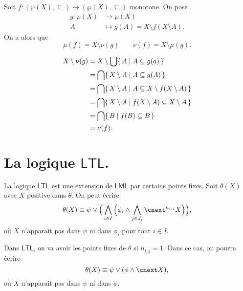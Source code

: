\documentclass[./main]{subfiles}
\begin{document}
  \begin{lem}
    Soit $f : (\wp(X), \subseteq) \to (\wp(X), \subseteq)$ monotone. On pose 
    \begin{align*}
      g: \wp(X) &\longrightarrow \wp(X) \\
      A &\longmapsto g(A) = X \setminus f(X \setminus A)
    .\end{align*}
    On a alors que 
    \[
    \mu(f) = X \setminus \nu(g) \quad\quad \nu(f) = X \setminus \mu(g)
    .\] 
  \end{lem}
  \begin{prv}
    \begin{align*}
      X \setminus \nu(g)
      &= X \setminus \bigcup \mleft\{\,A  \;\middle|\; A \subseteq g(a)\,\mright\}  \\
      &= \bigcap \mleft\{\,X \setminus A \;\middle|\; A \subseteq g(A)\,\mright\} \\
      &= \bigcap \mleft\{\,X \setminus A \;\middle|\; A \subseteq X \setminus f(X \setminus A)\,\mright\} \\
      &= \bigcap \mleft\{\,X \setminus A \;\middle|\; f(X \setminus A) \subseteq X \setminus A\,\mright\} \\
      &= \bigcap \mleft\{\,B \;\middle|\; f(B) \subseteq B\,\mright\}  \\
      &= \nu(f)
    .\end{align*}
  \end{prv}

  \section{La logique $\mathsf{LTL}$.}

  La logique $\mathsf{LTL}$ est une extension de $\mathsf{LML}$ par certains points fixes.
  Soit $\theta(X)$ avec  $X$ positive dans $\theta$.
  On peut écrire 
  \[
  \theta(X) \equiv \psi \lor \Big( \bigwedge_{i \in I} \Big( \phi_i \land \bigwedge_{j \in J_i} \nxt^{n_{i,j}} X \Big) \Big)
  ,\] 
  où $X$ n'apparait pas dans $\psi$ ni dans $\phi_i$ pour tout $i \in I$.

  Dans $\mathsf{LTL}$, on va avoir les points fixes de $\theta$ si $n_{i,j} = 1$.
  Dans ce cas, on pourra écrire 
  \[
  \theta(X) \equiv \psi \lor (\phi \land \nxt X)
  ,\] où $X$ n'apparait pas dans $\psi$ ni dans $\phi$.
\end{document}
